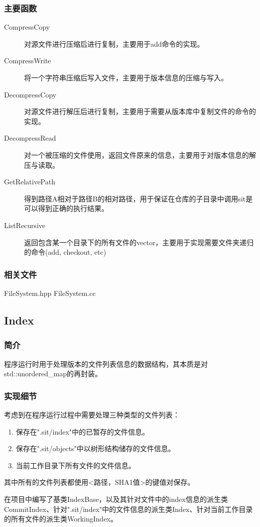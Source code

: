 \documentclass[11pt, a4paper, UTF8]{ctexart}
\begin{document}
\subsubsection{主要函数}
\begin{description}
	\item[CompressCopy] 对源文件进行压缩后进行复制，主要用于add命令的实现。
	\item[CompressWrite] 将一个字符串压缩后写入文件，主要用于版本信息的压缩与写入。
	\item[DecompressCopy] 对源文件进行解压后进行复制，主要用于需要从版本库中复制文件的命令的实现。
	\item[DecompressRead] 对一个被压缩的文件使用，返回文件原来的信息，主要用于对版本信息的解压与读取。
	\item[GetRelativePath] 得到路径A相对于路径B的相对路径，用于保证在仓库的子目录中调用sit是可以得到正确的执行结果。
	\item[ListRecursive] 返回包含某一个目录下的所有文件的vector，主要用于实现需要文件夹递归的命令(add, checkout, etc)
\end{description}
\subsubsection{相关文件}
FileSystem.hpp FileSystem.cc

\subsection{Index}
\subsubsection{简介}
程序运行时用于处理版本的文件列表信息的数据结构，其本质是对std::unordered\_map的再封装。
\subsubsection{实现细节}
考虑到在程序运行过程中需要处理三种类型的文件列表：
\begin{enumerate}
	\item 保存在".sit/index"中的已暂存的文件信息。
	\item 保存在".sit/objects"中以树形结构储存的文件信息。
	\item 当前工作目录下所有文件的文件信息。
\end{enumerate}
其中所有的文件列表都使用<路径，SHA1值>的键值对保存。

在项目中编写了基类IndexBase，以及其针对文件中的index信息的派生类CommitIndex、针对".sit/index"中的文件信息的派生类Index、针对当前工作目录的所有文件的派生类WorkingIndex。
\end{document}
